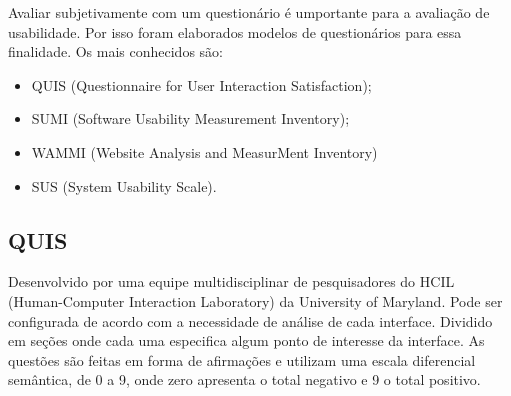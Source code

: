  Avaliar subjetivamente com um questionário é umportante para a avaliação de usabilidade. Por isso foram elaborados modelos de questionários para essa finalidade. Os mais conhecidos são:

 \begin{itemize}
	\item QUIS (Questionnaire for User Interaction Satisfaction);
	\item SUMI (Software Usability Measurement Inventory);
	\item WAMMI (Website Analysis and MeasurMent Inventory)
	\item SUS (System Usability Scale).
\end{itemize}

\subsection{QUIS}
Desenvolvido por uma equipe multidisciplinar de pesquisadores do HCIL (Human-Computer Interaction Laboratory) da University of Maryland. Pode ser configurada de acordo com a necessidade de análise de cada interface. Dividido em seções onde cada uma especifica algum ponto de interesse da interface.
As questões são feitas em forma de afirmações e utilizam uma escala diferencial semântica, de 0 a 9, onde zero apresenta o total negativo e 9 o total positivo.